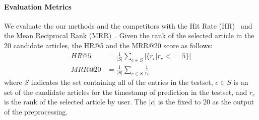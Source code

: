 %
%

\paragraph{\textbf{Evaluation Metrics}}
We evaluate the our methods and the competitors with the Hit Rate (HR)~\cite{EvalSessionRec} and the Mean Reciprocal Rank (MRR)~\cite{MRR}.
Given the rank of the selected article in the 20 candidate articles, the HR@5 and the MRR@20 score as follows:
\begin{align*}
	HR@5 &= \frac{1}{|S|}\sum_{c \in S}|\{r_c | r_c <= 5\}| \\
  MRR@20 &= \frac{1}{|S|}\sum_{c \in S} \frac{1}{r_c}
\end{align*}
where $S$ indicates the set containing all of the entries in the testset, $c \in S$ is an set of the candidate articles for the timestamp of prediction in the testset, and $r_c$ is the rank of the selected article by user.
The $|c|$ is the fixed to 20 as the output of the preprocessing.

